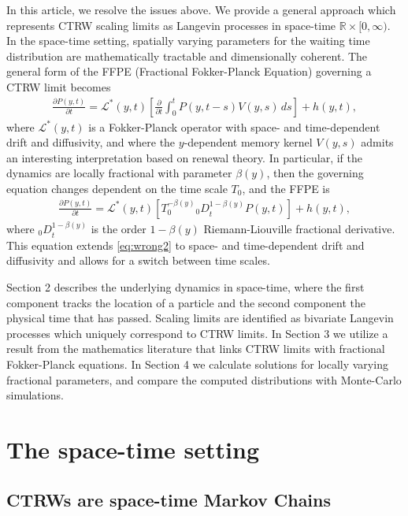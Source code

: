 \documentclass[a4paper,12pt]{article}
\numberwithin{equation}{section}
\theoremstyle{plain}
\theoremstyle{definition}
\theoremstyle{remark}
\numberwithin{equation}{section}
\newcommand{\spc}{\mathbb R}
\newcommand{\spctim}{\spc \times [0,\infty)}
\newcommand{\1}{\mathbf 1}
\newcommand{\del}{\partial}
\begin{document}
In this article, we resolve the issues above.  We provide a general approach
which represents CTRW scaling limits as Langevin processes in space-time
$\spctim$.  In the space-time setting, spatially varying parameters for the
waiting time distribution are mathematically tractable and dimensionally
coherent.  The general form of the FFPE (Fractional Fokker-Planck Equation)
governing a CTRW limit becomes
\begin{align}
\frac{\del P(y,t)}{\del t} = \mathcal L^*(y,t) \left[ \frac{\partial}{\partial t}
\int_0^t P(y,t-s) V(y,s)\,ds \right] + h(y,t),
\end{align}
where $\mathcal L^*(y,t)$ is a Fokker-Planck operator with space- and
time-dependent drift and diffusivity, and
where the $y$-dependent memory kernel $V(y,s)$ admits an interesting 
interpretation
based on renewal theory.  In particular, if the dynamics are locally fractional
with parameter $\beta(y)$, then the governing equation changes dependent on the 
time scale $T_0$, and the FFPE is
\begin{align}
\frac{\del P(y,t)}{\del t}
= \mathcal L^*(y,t) \left[ T_0^{-\beta(y)} {_0 D}_t^{1-\beta(y)} P(y,t) \right] + h(y,t),
\end{align}
where ${_0 D}_t^{1-\beta(y)}$ is the order $1-\beta(y)$ Riemann-Liouville
fractional derivative.  This equation extends \eqref{eq:wrong2} to
space- and time-dependent drift and diffusivity and allows for a switch
between time scales.


Section 2 describes the underlying dynamics in space-time, where the first
component tracks the location of a particle and the second component the
physical time that has passed.  Scaling limits are identified as bivariate
Langevin processes which uniquely correspond to CTRW limits.
In Section 3 we utilize a result from the mathematics literature that links CTRW 
limits with fractional Fokker-Planck equations.
In Section 4 we calculate solutions for locally varying fractional parameters,
and compare the computed distributions with Monte-Carlo simulations.


\section{The space-time setting}

\subsection{CTRWs are space-time Markov Chains}
\end{document}
